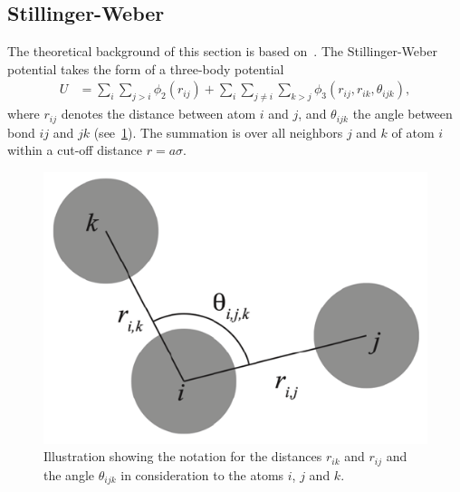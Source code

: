 \subsection{Stillinger-Weber}\label{sec:wb}
The theoretical background of this section is based on~\cite{docs_lammps_sw, PhysRevB.31.5262}. The Stillinger-Weber potential takes the form of a three-body potential
\begin{align*}
  U &=\sum_i \sum_{j>i} \phi_2(r_{i j})+\sum_i \sum_{j \neq i} \sum_{k>j} \phi_3(r_{ij}, r_{ik}, \theta_{ijk}),
\end{align*}
where $r_{ij}$ denotes the distance between atom $i$ and $j$, and $\theta_{ijk}$
the angle between bond $ij$ and $jk$ (see~\cref{fig:three_body_angle}). The summation is over all neighbors $j$
and $k$ of atom $i$ within a cut-off distance $r = a\sigma$. 

\begin{figure}[!htb]
  \centering
  \includegraphics[width=0.35\linewidth]{figures/theory/three_body_angle.pdf}
  \caption{Illustration showing the notation for the distances $r_{ik}$ and $r_{ij}$ and the angle $\theta_{ijk}$ in consideration to the atoms $i$, $j$ and $k$.}
  \label{fig:three_body_angle}
\end{figure}


